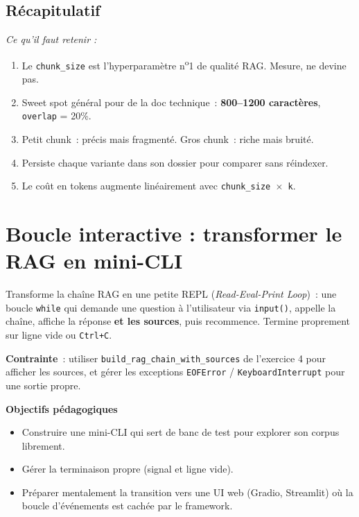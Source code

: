 \documentclass[11pt,a4paper]{article}
\begin{document}
\subsection*{Récapitulatif}
{\itshape\sloppy
\textit{Ce qu'il faut retenir :}
\begin{enumerate}[leftmargin=*]
  \item Le \texttt{chunk\_size} est l'hyperparamètre n\textsuperscript{o}1
        de qualité RAG. Mesure, ne devine pas.
  \item Sweet spot général pour de la doc technique~: \textbf{800--1200
        caractères}, \texttt{overlap} = 20\%.
  \item Petit chunk~: précis mais fragmenté. Gros chunk~: riche mais
        bruité.
  \item Persiste chaque variante dans son dossier pour comparer sans
        réindexer.
  \item Le coût en tokens augmente linéairement avec \texttt{chunk\_size
        \(\times\) k}.
\end{enumerate}
\par}

\section{Boucle interactive : transformer le RAG en mini-CLI}

\begin{tcolorbox}[title=Exercice bonus 2. Une boucle while pour explorer la doc librement]
Transforme la chaîne RAG en une petite REPL (\emph{Read-Eval-Print Loop})~:
une boucle \texttt{while} qui demande une question à l'utilisateur via
\texttt{input()}, appelle la chaîne, affiche la réponse \textbf{et les
sources}, puis recommence. Termine proprement sur ligne vide ou
\texttt{Ctrl+C}.

\textbf{Contrainte}~: utiliser \texttt{build\_rag\_chain\_with\_sources}
de l'exercice 4 pour afficher les sources, et gérer les exceptions
\texttt{EOFError} / \texttt{KeyboardInterrupt} pour une sortie propre.

\bigskip
\noindent\textbf{Objectifs pédagogiques}
\begin{itemize}[leftmargin=*]
  \item Construire une mini-CLI qui sert de banc de test pour explorer
        son corpus librement.
  \item Gérer la terminaison propre (signal et ligne vide).
  \item Préparer mentalement la transition vers une UI web (Gradio,
        Streamlit) où la boucle d'événements est cachée par le framework.
\end{itemize}
\end{tcolorbox}
\end{document}
